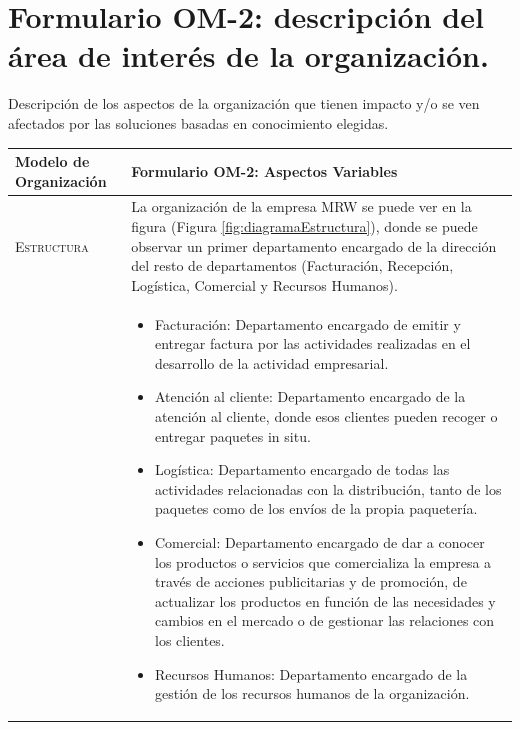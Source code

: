 
\section{Formulario OM-2: descripción del área de interés de la organización.}

Descripción de los aspectos de la organización que tienen impacto y/o se ven afectados
  por las soluciones basadas en conocimiento elegidas.


\begin{table}[H]
\scriptsize
\begin{tabularx}{\textwidth}{|l|X|} \hline
\textbf{Modelo de Organización} & \textbf{Formulario OM-2: Aspectos Variables} \\ \hline\hline

\textsc{Estructura} & La organización de la empresa MRW se puede ver en la figura (Figura \ref{fig:diagramaEstructura}), donde se puede observar un primer departamento encargado de la dirección del resto de departamentos (Facturación, Recepción, Logística, Comercial y Recursos Humanos). \\ &
\begin{itemize}
  \item Facturación: Departamento encargado de emitir y entregar factura por las actividades realizadas en el desarrollo de la actividad empresarial.
  \item Atención al cliente: Departamento encargado de la atención al cliente, donde esos clientes pueden recoger o entregar paquetes in situ.
  \item Logística: Departamento encargado de todas las actividades relacionadas con la distribución, tanto de los paquetes como de los envíos de la propia paquetería.
  \item Comercial: Departamento encargado de dar a conocer los productos o servicios que comercializa la empresa a través de acciones publicitarias y de promoción, de actualizar los productos en función de las necesidades y cambios en el mercado o de gestionar las relaciones con los clientes.
  \item Recursos Humanos: Departamento encargado de la gestión de los recursos humanos de la organización.
\end{itemize} \\ \hline


\end{tabularx}
\end{table}
